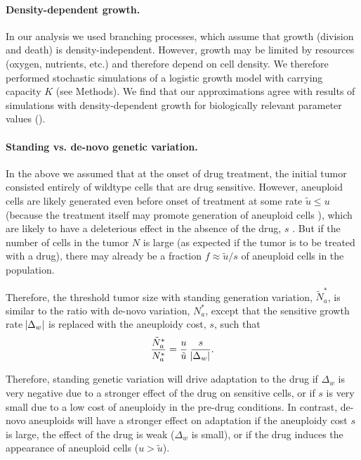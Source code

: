 \documentclass[12pt]{extarticle}
\begin{document}
\paragraph*{Density-dependent growth.}

In our analysis we used branching processes, which assume that growth (division and death) is density-independent. However, growth may be limited by resources (oxygen, nutrients, etc.) and therefore depend on cell density. 
We therefore performed stochastic simulations of a logistic growth model with carrying capacity $K$ (see Methods). 
We find that our approximations agree with results of simulations with density-dependent growth for biologically relevant parameter values ().

\paragraph*{Standing vs. de-novo genetic variation.}

In the above we assumed that at the onset of drug treatment, the initial tumor consisted entirely of wildtype cells that are drug sensitive.
However, aneuploid cells are likely generated even before onset of treatment at some rate $\tilde{u} \le u$ (because the treatment itself may promote generation of aneuploid cells \citep{wang2019molecular,mason2017functional}), which are likely to have a deleterious effect in the absence of the drug, $s$ \citep{replogle2020aneuploidy,giam2015aneuploidy}. %
But if the number of cells in the tumor $N$ is large (as expected if the tumor is to be treated with a drug), there may already be a fraction $f \approx \tilde{u}/s$ of aneuploid cells in the population.

Therefore, the threshold tumor size with standing generation variation, $\tilde{N}^*_{a}$, is similar to the ratio with de-novo variation, $N^*_a$, except that the sensitive growth rate $\abs{\Delta_w}$ is replaced with the aneuploidy cost, $s$, such that 
\begin{equation}
\frac{\tilde{N}^*_{a}}{N^*_{a}} = \frac{u}{\tilde{u}} \; \frac{s}{\abs{\Delta_w}}.
\end{equation}

Therefore, standing genetic variation will drive adaptation to the drug if $\Delta_w$ is very negative due to a stronger effect of the drug on sensitive cells, or if $s$ is very small due to a low cost of aneuploidy in the pre-drug conditions.
In contrast, de-novo aneuploids will have a stronger effect on adaptation if the aneuploidy cost $s$ is large, the effect of the drug is weak ($\Delta_w$ is small), or if the drug induces the appearance of aneuploid cells ($u > \tilde u$). 
\end{document}
